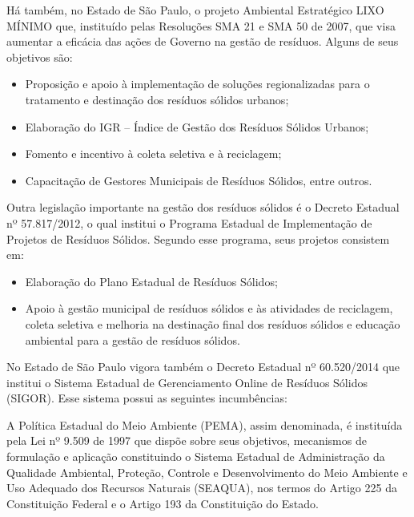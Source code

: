 	 Há também, no Estado de São Paulo, o projeto Ambiental Estratégico LIXO MÍNIMO que, instituído pelas Resoluções SMA 21 e SMA 50 de 2007, que visa aumentar a eficácia das ações de Governo na gestão de resíduos. Alguns de seus objetivos são: 
	 
	\begin{itemize}
	\item Proposição e apoio à implementação de soluções regionalizadas para o tratamento e destinação dos resíduos sólidos urbanos;
	\item Elaboração do IGR – Índice de Gestão dos Resíduos Sólidos Urbanos; 
	\item Fomento e incentivo à coleta seletiva e à reciclagem; 
	\item Capacitação de Gestores Municipais de Resíduos Sólidos, entre outros.
	\end{itemize}

	Outra legislação importante na gestão dos resíduos sólidos é o Decreto Estadual nº 57.817/2012, o qual institui o Programa Estadual de Implementação de Projetos de Resíduos Sólidos. Segundo esse programa, seus  projetos consistem em:
	
	\begin{itemize}
	\item Elaboração do Plano Estadual de Resíduos Sólidos;
	\item Apoio à gestão municipal de resíduos sólidos e às atividades de reciclagem, coleta seletiva e melhoria na destinação final dos resíduos sólidos e educação ambiental para a gestão de resíduos sólidos.
	\end{itemize}

	No Estado de São Paulo vigora também o Decreto Estadual nº 60.520/2014 que institui o Sistema Estadual de Gerenciamento Online de Resíduos Sólidos (SIGOR). Esse sistema possui as seguintes  incumbências:
	
	
	A Política Estadual do Meio Ambiente (PEMA), assim denominada, é instituída pela Lei nº 9.509 de 1997 que dispõe sobre seus objetivos, mecanismos de formulação e aplicação constituindo o Sistema Estadual de Administração da Qualidade Ambiental, Proteção, Controle e Desenvolvimento do Meio Ambiente e Uso Adequado dos Recursos Naturais (SEAQUA), nos termos do Artigo 225 da Constituição Federal e o Artigo 193 da Constituição do Estado. 
	
